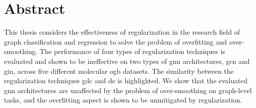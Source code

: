 %
\chapter*{Abstract}
\label{sec:abstract}
\vspace*{-10mm}

This thesis considers the effectiveness of regularization in the research field of graph classification and regression to solve the problem of overfitting and over-smoothing. %
The performance of four types of regularization techniques is evaluated and shown to be ineffective on two types of \ac{gnn} architectures, \ac{gcn} and \ac{gin}, across five different molecular \ac{ogb} datasets. The similarity between the regularization techniques \ac{gdc} and \ac{de} is highlighted.
We show that the evaluated \ac{gnn} architectures are unaffected by the problem of over-smoothing on graph-level tasks, and the overfitting aspect is shown to be unmitigated by regularization.



